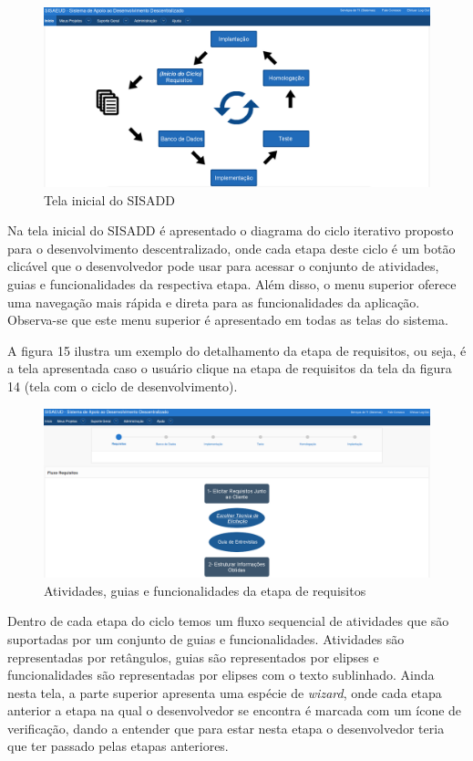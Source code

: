 \begin{figure}[!h]
	\hspace*{-1.5cm} 
		\includegraphics[scale=0.40]{figuras/home_p1}
	\caption{Tela inicial do SISADD}
\end{figure}

Na tela inicial do SISADD é apresentado o diagrama do ciclo iterativo proposto para o desenvolvimento descentralizado, onde cada etapa deste ciclo é um botão clicável que o desenvolvedor pode usar para acessar o conjunto de atividades, guias e funcionalidades da respectiva etapa. Além disso, o menu superior oferece uma navegação mais rápida e direta para as funcionalidades da aplicação. Observa-se que este menu superior é apresentado em todas as telas do sistema.

A figura 15 ilustra um exemplo do detalhamento da etapa de requisitos, ou seja, é a tela apresentada caso o usuário clique na etapa de requisitos da tela da figura 14 (tela com o ciclo de desenvolvimento).

\begin{figure}[!htb]
	\hspace*{-1.0cm} 
		\includegraphics[scale=0.40]{figuras/fluxo_req_p2}
	\caption{Atividades, guias e funcionalidades da etapa de requisitos}
\end{figure}

Dentro de cada etapa do ciclo temos um fluxo sequencial de atividades que são suportadas por um conjunto de guias e funcionalidades. Atividades são representadas por retângulos, guias são representados por elipses e funcionalidades são representadas por elipses com o texto sublinhado. Ainda nesta tela, a parte superior apresenta uma espécie de \textit{wizard}, onde cada etapa anterior a etapa na qual o desenvolvedor se encontra é marcada com um ícone de verificação, dando a entender que para estar nesta etapa o desenvolvedor teria que ter passado pelas etapas anteriores. %

